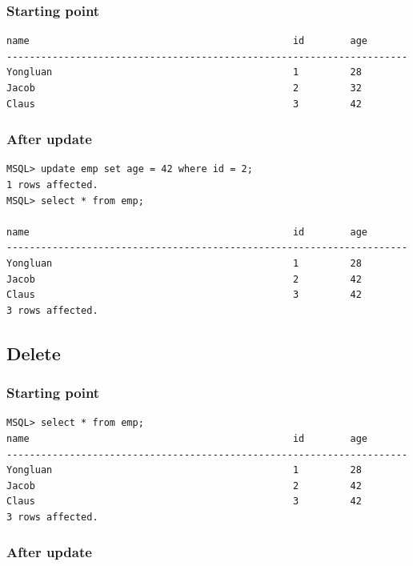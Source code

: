\documentclass[a4paper,10pt,titlepage]{report}
\begin{document}
\subsubsection{Starting point}
\begin{lstlisting}
name                                              id        age       
----------------------------------------------------------------------
Yongluan                                          1         28        
Jacob                                             2         32        
Claus                                             3         42       
\end{lstlisting}
\subsubsection{After update}
\begin{lstlisting}
MSQL> update emp set age = 42 where id = 2;
1 rows affected.
MSQL> select * from emp;

name                                              id        age       
----------------------------------------------------------------------
Yongluan                                          1         28        
Jacob                                             2         42        
Claus                                             3         42        
3 rows affected.
\end{lstlisting}

\subsection{Delete}
\subsubsection{Starting point}
\begin{lstlisting}
MSQL> select * from emp;
name                                              id        age       
----------------------------------------------------------------------
Yongluan                                          1         28        
Jacob                                             2         42        
Claus                                             3         42        
3 rows affected.
\end{lstlisting}
\subsubsection{After update}
\end{document}
